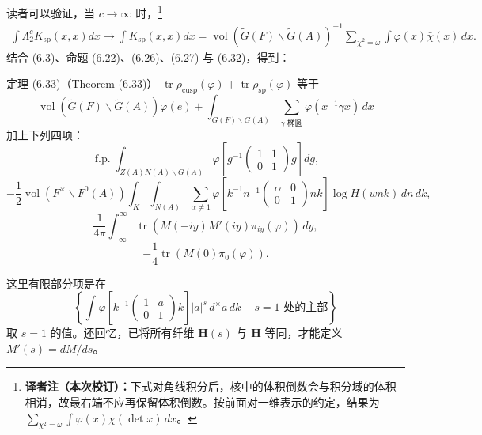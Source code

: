读者可以验证，当 $c\to\infty$ 时，\footnote{\textbf{译者注（本次校订）：}下式对角线积分后，核中的体积倒数会与积分域的体积相消，故最右端不应再保留体积倒数。按前面对一维表示的约定，结果为 $\sum_{\chi^2=\omega}\int\varphi(x)\chi(\det x)\,dx$。}
\[
\begin{split}
 \int\Lambda_2^cK_{\mathrm{sp}}(x,x)dx\longrightarrow\int K_{\mathrm{sp}}(x,x)dx
 =\operatorname{vol}(\widetilde G(F)\backslash\widetilde G(A))^{-1}
 \sum_{\chi^2=\omega}\int\varphi(x)\bar\chi(x)\,dx.
\end{split}
\]
结合 (6.3)、命题 (6.22)、(6.26)、(6.27) 与 (6.32)，得到：
\begin{originaltheorem}{定理 (6.33)（Theorem (6.33)）}
$\operatorname{tr}\rho_{\mathrm{cusp}}(\varphi)+\operatorname{tr}\rho_{\mathrm{sp}}(\varphi)$ 等于
\[
 \operatorname{vol}(\widetilde G(F)\backslash\widetilde G(A))\varphi(e)
 +\int_{G(F)\backslash\widetilde G(A)}\sum_{\gamma\text{ 椭圆}}
 \varphi(x^{-1}\gamma x)\,dx
\]
加上下列四项：
\begin{equation}
 \operatorname{f.p.}\int_{Z(A)N(A)\backslash G(A)}
 \varphi\!\left[g^{-1}\begin{pmatrix}1&1\\0&1\end{pmatrix}g\right]dg,\tag{6.34}
\end{equation}
\begin{equation}
 -\frac12\operatorname{vol}(F^\times\backslash F^0(A))
 \int_K\int_{N(A)}\sum_{\alpha\ne1}
 \varphi\!\left[k^{-1}n^{-1}\begin{pmatrix}\alpha&0\\0&1\end{pmatrix}nk\right]
 \log H(wnk)\,dn\,dk,\tag{6.35}
\end{equation}
\begin{equation}
 \frac1{4\pi}\int_{-\infty}^{\infty}
 \operatorname{tr}(M(-iy)M'(iy)\pi_{iy}(\varphi))\,dy,\tag{6.36}
\end{equation}
\begin{equation}
 -\frac14\operatorname{tr}(M(0)\pi_0(\varphi)).\tag{6.37}
\end{equation}
\end{originaltheorem}
这里有限部分项是在
\[
 \left\{\int\varphi\!\left[k^{-1}\begin{pmatrix}1&a\\0&1\end{pmatrix}k\right]
 |a|^s\,d^\times a\,dk-\text{$s=1$ 处的主部}\right\}
\]
取 $s=1$ 的值。还回忆，已将所有纤维 $\mathbf H(s)$ 与 $\mathbf H$ 等同，才能定义
$M'(s)=dM/ds$。


